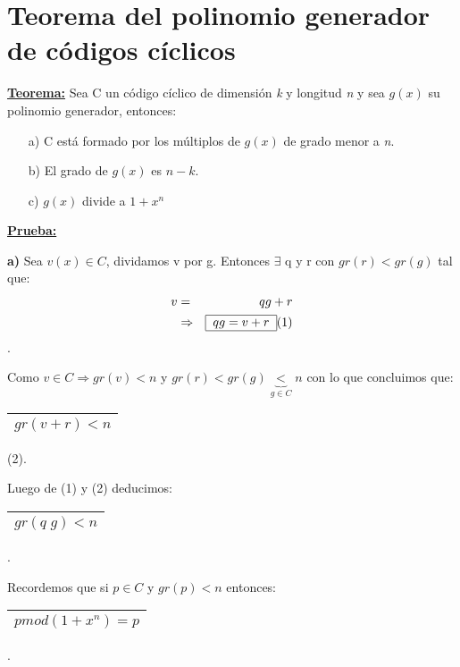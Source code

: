 \documentclass[12pt,a4paper]{report}
\begin{document}
	\section{Teorema del polinomio generador de códigos cíclicos}
		\textbf{\underline{Teorema:}} Sea C un código cíclico de dimensión \textit{k} y longitud \textit{n} y sea $g(x)$ su polinomio generador, entonces:
			\begin{itemize}
				\item[a)] C está formado por los múltiplos de $g(x)$ de grado menor a \textit{n}.
				\item[b)] El grado de $g(x)$ es $n - k$.
				\item[c)] $g(x)$ divide a $1 + x^{n}$
			\end{itemize}

		\textbf{\underline{Prueba:}}
			\par \textbf{a)} Sea $v(x) \in C$, dividamos v por g. Entonces $\exists$ q y r con $gr(r) < gr(g)$ tal que:
			\begin{eqnarray}
				\nonumber v &=& q g + r \\
				\nonumber & \Rightarrow & \begin{tabular}{|c|} \hline $q g = v + r $ \\ \hline \end{tabular} (1)
			\end{eqnarray}.

			\par Como $v \in C \Rightarrow gr(v) < n$ y $gr(r) < gr(g) \underbrace{<}_{g \in C} n $ con lo que concluimos que:
			\begin{center}
				\begin{tabular}{|c|} \hline $gr(v + r) < n $ \\ \hline \end{tabular} (2).
			\end{center}
			\par Luego de (1) y (2) deducimos: \begin{tabular}{|c|} \hline $gr(q \; g) < n $ \\ \hline \end{tabular}.

			\vspace{3mm}
			\par Recordemos que si $p \in C$ y $gr(p) < n$ entonces: \begin{tabular}{|c|} \hline $p mod (1+ x^{n}) = p$ \\\hline \end{tabular}.
\end{document}
